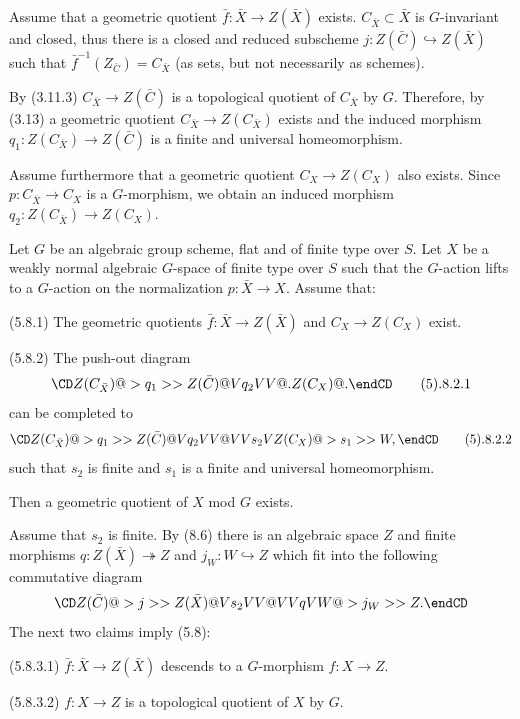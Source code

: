 Assume that a geometric quotient $\bar f:\bar X\to Z(\bar X)$ exists.
$C_{\bar X}\subset \bar X$ is $G$-invariant and closed, thus there is a
closed and reduced subscheme  $j:Z(\bar C)\hookrightarrow  Z(\bar X)$  such
that
$\bar f^{-1}(Z_{\bar C})=C_{\bar X}$ (as sets, but not necessarily as
schemes).

By (3.11.3)
$C_{\bar X}\to Z(\bar C)$ is a topological quotient of $C_{\bar X}$
by
$G$. Therefore, by (3.13) a geometric quotient  $C_{\bar X}\to Z(C_{\bar
X})$ exists and the induced morphism $q_1: Z(C_{\bar X}) \to   Z(\bar C)$
is a finite and universal homeomorphism.

Assume furthermore that
a geometric quotient  $C_X\to Z(C_X)$  also exists. Since $p:C_{\bar X}\to
C_X$ is a $G$-morphism, we obtain an induced morphism $q_2: Z(C_{\bar X}) \to
Z(C_X)$.
\enddemo

   Let $G$ be an algebraic group scheme, flat and of
finite type over $S$. Let $X$ be a  weakly normal
algebraic $G$-space of finite type over $S$ such that the $G$-action lifts to a
$G$-action on the normalization $p:\bar X\to X$.  Assume that:

(5.8.1) The  geometric quotients
 $\bar f:\bar X\to Z(\bar X)$ and $C_X\to Z(C_X)$ exist.

(5.8.2) The push-out diagram
$$
\CD
Z(C_{\bar X})@>q_1>>  Z(\bar C)\\
@Vq_2VV @.\\
Z(C_X) @.
\endCD\tag 5.8.2.1
$$
can be completed to
$$
\CD
Z(C_{\bar X})@>q_1>>  Z(\bar C)\\
@Vq_2VV @VVs_2V\\
Z(C_X) @>s_1>> W,
\endCD\tag 5.8.2.2
$$
such that $s_2$ is   finite and  $s_1$ is a
finite and universal homeomorphism.
\smallpagebreak

Then a geometric quotient of $X$ mod $G$ exists.
\endproclaim



\demop Assume that $ s_2$ is finite. By (8.6)
there is an algebraic space $Z$ and  finite morphisms
$q:Z(\bar X)\twoheadrightarrow Z$  and $j_W: W\hookrightarrow Z$ which fit into
the following commutative diagram
$$
\CD
Z(\bar C)@>j>> Z(\bar X)\\
@Vs_2VV @VVqV\\
W@>j_W>> Z.
\endCD
$$
The next two claims imply (5.8):

  (5.8.3.1) $\bar f: \bar X\to Z(\bar X)$ descends to
a
$G$-morphism
$f:X\to Z$.

(5.8.3.2) $f:X\to Z$ is a topological quotient of $X$ by $G$.
\endproclaim

